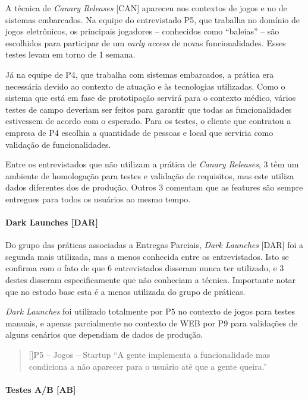 A técnica de \emph{Canary Releases} [CAN] apareceu nos contextos de jogos e no de sistemas embarcados. Na equipe do entrevistado P5, que trabalha no domínio de jogos eletrônicos, os principais jogadores -- conhecidos como ``baleias'' -- são escolhidos para participar de um \emph{early access} de novas funcionalidades.  Esses testes levam em torno de 1 semana. 

Já na equipe de P4, que trabalha com sistemas embarcados, a prática era necessária devido ao contexto de atuação e às tecnologias utilizadas. Como o sistema que está em fase de prototipação servirá para o contexto médico, vários testes de campo deveriam ser feitos para garantir que todas as funcionalidades estivessem de acordo com o esperado. Para os testes, o cliente que contratou a empresa de P4 escolhia a quantidade de pessoas e local que serviria como validação de funcionalidades.

Entre os entrevistados que não utilizam a prática de \emph{Canary Releases}, 3 têm um ambiente de homologação para testes e validação de requisitos, mas este utiliza dados diferentes dos de produção. Outros 3 comentam que as features são sempre entregues para todos os usuários ao mesmo tempo.


\paragraph{Dark Launches [DAR]}

Do grupo das práticas associadas a Entregas Parciais, \emph{Dark Launches} [DAR] foi a segunda mais utilizada, mas a menos conhecida entre os entrevistados. Isto se confirma com o fato de que 6 entrevistados disseram nunca ter utilizado, e 3 destes disseram especificamente que não conheciam a técnica. Importante notar que no estudo base \cite{empiricalStudy2016} esta é a menos utilizada do grupo de práticas.

\emph{Dark Launches} foi utilizado totalmente por P5 no contexto de jogos para testes manuais, e apenas parcialmente no contexto de WEB por P9 para validações de alguns cenários que dependiam de dados de produção.


\begin{quotation}[]{P5 -- Jogos -- Startup}
    ``A gente implementa a funcionalidade mas condiciona a não aparecer para o usuário até que a gente queira.''
\end{quotation}

\paragraph{Testes A/B [AB]}

